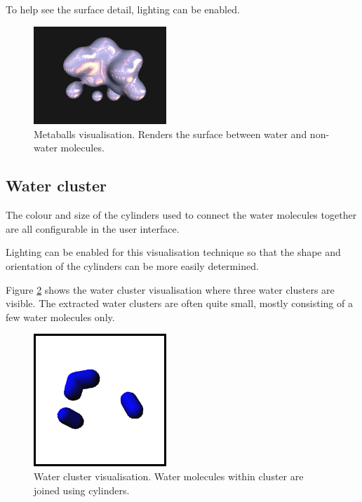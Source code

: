 To help see the surface detail, lighting can be enabled.

\begin{figure}
  \begin{center}
    \includegraphics[width=50mm]{metaballs}
  \end{center}
  \caption{Metaballs visualisation. Renders the surface between water and
  non-water molecules.}
  \label{fig:implementation_metaballs}
\end{figure}



\subsection*{Water cluster}

The colour and size of the cylinders used to connect the water molecules
together are all configurable in the user interface.

Lighting can be enabled for this visualisation technique so that the shape and
orientation of the cylinders can be more easily determined.

Figure \ref{fig:implementation_watercluster} shows the water cluster
visualisation where three water clusters are visible. The extracted water
clusters are often quite small, mostly consisting of a few water molecules only.

\begin{figure}
  \begin{center}
    \includegraphics[width=50mm]{watercluster}
  \end{center}
  \caption{Water cluster visualisation. Water molecules within cluster are
  joined using cylinders.}
  \label{fig:implementation_watercluster}
\end{figure}

